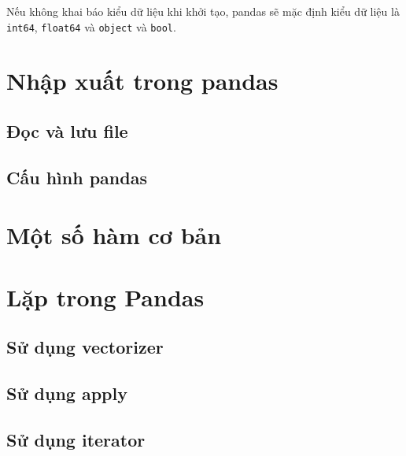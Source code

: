 \documentclass[
]{book}
\begin{document}
Nếu không khai báo kiểu dữ liệu khi khởi tạo, pandas sẽ mặc định kiểu dữ liệu là \texttt{int64}, \texttt{float64} và \texttt{object} và \texttt{bool}.

\hypertarget{nhux1eadp-xuux1ea5t-trong-pandas}{%
\chapter{Nhập xuất trong pandas}\label{nhux1eadp-xuux1ea5t-trong-pandas}}

\hypertarget{ux111ux1ecdc-vuxe0-lux1b0u-file}{%
\section{Đọc và lưu file}\label{ux111ux1ecdc-vuxe0-lux1b0u-file}}

\hypertarget{cux1ea5u-huxecnh-pandas}{%
\section{Cấu hình pandas}\label{cux1ea5u-huxecnh-pandas}}

\hypertarget{mux1ed9t-sux1ed1-huxe0m-cux1a1-bux1ea3n}{%
\chapter{Một số hàm cơ bản}\label{mux1ed9t-sux1ed1-huxe0m-cux1a1-bux1ea3n}}

\hypertarget{lux1eb7p-trong-pandas}{%
\chapter{Lặp trong Pandas}\label{lux1eb7p-trong-pandas}}

\hypertarget{sux1eed-dux1ee5ng-vectorizer}{%
\section{Sử dụng vectorizer}\label{sux1eed-dux1ee5ng-vectorizer}}

\hypertarget{sux1eed-dux1ee5ng-apply}{%
\section{Sử dụng apply}\label{sux1eed-dux1ee5ng-apply}}

\hypertarget{sux1eed-dux1ee5ng-iterator}{%
\section{Sử dụng iterator}\label{sux1eed-dux1ee5ng-iterator}}
\end{document}
